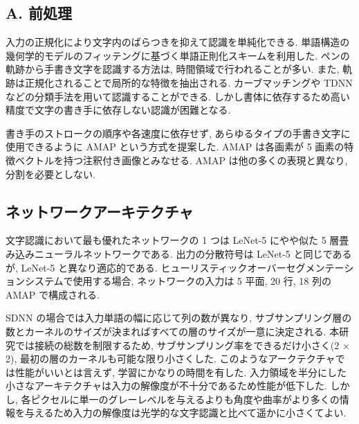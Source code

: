 \documentclass[twocolumn]{jarticle}     %
\begin{document}
\subsection{A. 前処理}
入力の正規化により文字内のばらつきを抑えて認識を単純化できる.
単語構造の幾何学的モデルのフィッテングに基づく単語正則化スキームを利用した. 
ペンの軌跡から手書き文字を認識する方法は, 時間領域で行われることが多い. また, 軌跡は正規化されることで局所的な特徴を抽出される. 
カーブマッチングや TDNN などの分類手法を用いて認識することができる. しかし書体に依存するため高い精度で文字の書き手に依存しない認識が困難となる. 
\par
書き手のストロークの順序や各速度に依存せず, あらゆるタイプの手書き文字に使用できるように AMAP という方式を提案した. AMAP は各画素が 5 画素の特徴ベクトルを持つ注釈付き画像とみなせる. AMAP は他の多くの表現と異なり, 分割を必要としない. 

\subsection*{ネットワークアーキテクチャ}
文字認識において最も優れたネットワークの 1 つは LeNet-5 にやや似た 5 層畳み込みニューラルネットワークである. 
出力の分散符号は LeNet-5 と同じであるが, LeNet-5 と異なり適応的である. ヒューリスティックオーバーセグメンテーションシステムで使用する場合, ネットワークの入力は 5 平面, 20 行, 18 列の AMAP で構成される. 

SDNN の場合では入力単語の幅に応じて列の数が異なり, サブサンプリング層の数とカーネルのサイズが決まればすべての層のサイズが一意に決定される. 本研究では接続の総数を制限するため, サブサンプリング率をできるだけ小さく(2 × 2), 最初の層のカーネルも可能な限り小さくした. 
このようなアークテクチャでは性能がいいとは言えず, 学習にかなりの時間を有した. 入力領域を半分にした小さなアーキテクチャは入力の解像度が不十分であるため性能が低下した.
しかし, 各ピクセルに単一のグレーレベルを与えるよりも角度や曲率がより多くの情報を与えるため入力の解像度は光学的な文字認識と比べて遥かに小さくてよい.
\end{document}
